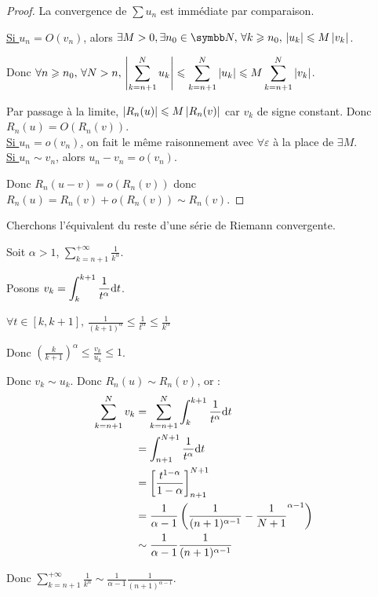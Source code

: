 \begin{proof}
    La convergence de $\sum u_n$ est immédiate par comparaison. 

    \uline{Si $u_n =  O(v_n)$}, alors $\exists M > 0, \exists n_0 \in \N, \, \forall k \geqslant n_0, \, \abs{u_k} \leqslant M \abs{v_k}$.

    Donc $\displaystyle \forall n \geqslant n_0, \, \forall N > n, \, \left|\sum_{k = n + 1 }^{N } u_k\right| \leqslant \sum_{k = n + 1 }^{N } \left|u_k\right| \leqslant M \sum_{k = n + 1}^{N } \left|v_k\right|$.

    Par passage à la limite, $\left|R_n(u)\right| \leqslant M \left|R_n(v)\right|$ car $v_k$ de signe constant. 
    Donc $R_n(u) = O(R_n(v))$. \\

    \uline{Si $u_n = o(v_n)$,} 
    on fait le même raisonnement avec $\forall \varepsilon$ à la place de $\exists M$. \\

    \uline{Si $u_n \sim v_n$}, alors $u_n - v_n = o(v_n)$. 

    Donc $R_n(u - v) = o(R_n(v))$ donc $R_n(u) = R_n(v) + o(R_n(v)) \sim R_n(v)$.
\end{proof}

\begin{exemple}
    Cherchons l'équivalent du reste d'une série de Riemann convergente. 

    Soit $\alpha > 1$, $\displaystyle \sum_{k = n + 1}^{+ \infty } \frac 1 {k^\alpha}$.

    Posons $\displaystyle v_k = \int_k^{k + 1} \frac 1 {t^\alpha} \text d t$. 

    $\displaystyle \forall t \in [k, k + 1], \, \frac 1 {(k + 1)^\alpha} \leqslant \frac 1 {t^\alpha} \leqslant \frac 1 {k^\alpha}$

    Donc $\displaystyle \left( \frac k {k +  1} \right)^\alpha \leqslant \frac {v_k}{u_k} \leqslant 1$.

    Donc $v_k \sim u_k$.
    Donc $R_n(u) \sim R_n(v)$, or :
    \begin{align*}
        \sum_{k = n + 1 }^{N } v_k & = \sum_{k = n + 1}^{N } \int_k^{k + 1} \frac 1 {t^\alpha} \text d t \\
                                   & = \int_{n + 1}^{N + 1} \frac 1 {t^\alpha} \text d t \\
                                   & = \left[ \frac{t^{1 - \alpha}}{1 - \alpha} \right]_{n + 1}^{N + 1} \\
                                   & = \frac 1 {\alpha - 1} \left( \frac 1 {(n + 1)^{\alpha - 1}} - \frac 1 {N + 1}^{\alpha - 1} \right) \\
                                   & \sim \frac 1 {\alpha - 1} \frac 1 {(n + 1)^{\alpha - 1}} 
    \end{align*}

    Donc $\displaystyle \sum_{k = n + 1}^{+ \infty} \frac 1 {k^\alpha} \sim \frac 1 {\alpha - 1} \frac 1 {(n + 1)^{\alpha - 1}}$. \\
\end{exemple}     

